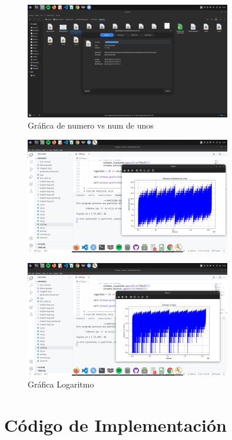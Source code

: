 \documentclass[11pt]{article} %
\begin{document}
	
	\begin{figure}[h]
		\centering
		\includegraphics[width=0.8\textwidth]{imagen1u.png}
		\caption{Gráfica de numero vs num de unos}
	\end{figure}
	
	\begin{figure}[h]
		\centering
		\includegraphics[width=0.8\textwidth]{imagen2u.png}
		\caption{}
	\end{figure}
	
	\begin{figure}[h]
		\centering
		\includegraphics[width=0.8\textwidth]{imagen3u.png}
		\caption{Gráfica Logaritmo}
	\end{figure}
	
	
	\section{Código de Implementación}
	
\end{document}
